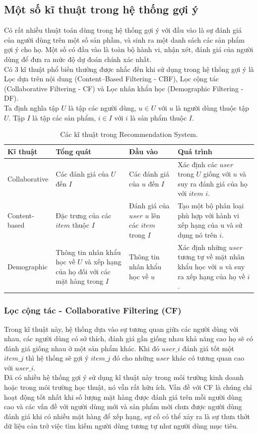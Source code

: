 \subsection{Một số kĩ thuật trong hệ thống gợi ý}
Có rất nhiều thuật toán dùng trong hệ thống gợi ý với đầu vào là sự đánh giá của người dùng trên một số sản phầm, và sinh ra một danh sách các sản phẩm gợi ý cho họ. Một số có đầu vào là toàn bộ hành vi, nhận xét, đánh giá của người dùng để đưa ra mức độ dự đoán chính xác nhất.\\
Có 3 kĩ thuật phổ biến thường được nhắc đến khi sử dụng trong hệ thống gợi ý là Lọc dựa trên nội dung (Content–Based Filtering - CBF), Lọc cộng tác (Collaborative Filtering - CF) và Lọc nhân khẩu học (Demographic Filtering - DF).\\
Ta định nghĩa tập $U$ là tập các người dùng, $u \in U$ với $u$ là người dùng thuộc tập $U$. Tập $I$ là tập các sản phẩm, $i \in I$ với $i$ là sản phẩm thuộc $I$.
\begin{table}[H]
    \centering
    \begin{tabular}{|p{3cm}|p{3cm}|p{3cm}|p{3.5cm}|}
    \hline
        \textbf{Kĩ thuật} & \textbf{Tổng quát}& \textbf{Đầu vào}& \textbf{Quá trình} \\ \hline
         Collaborative & Các đánh giá của $U$ đến $I$ & Các đánh giá của $u$ đến $I$ & Xác định các $user$ trong $U$ giống với $u$ và suy ra đánh giá  của họ với $item$ $i$.\\ \hline
         Content-based & Đặc trưng của các $item$ thuộc $I$ & Đánh giá của $user$ $u$ lên các $item$ trong $I$ & Tạo một bộ phân loại phù hợp với hành vi xếp hạng của u và sử dụng nó trên $i$.\\ \hline
         Demographic & Thông tin nhân khẩu học về $U$ và xếp hạng của họ đối với các mặt hàng trong $I$ & Thông tin nhân khẩu học về $u$ & Xác định những $user$ tương tự về mặt nhân khẩu học với $u$ và suy ra xếp hạng của họ về $i$. \\ \hline
    \end{tabular}
    \caption{Các kĩ thuật trong Recommendation System.}
    \label{tab:my_label}
\end{table}

\subsubsection{Lọc cộng tác - Collaborative Filtering (CF)}
Trong kĩ thuật này, hệ thống dựa vào sự tương quan giữa các người dùng với nhau, các người dùng có sở thích, đánh giá gần giống nhau khả năng cao họ sẽ có đánh giá giống nhau ở một sản phẩm khác. Khi đó $user\_i$ đánh giá tốt một $item\_j$ thì hệ thống sẽ gợi ý $item\_j$ đó cho những $user$ khác có tương quan cao với $user\_i$.\\
Đã có nhiều hệ thống gợi ý sử dụng kĩ thuật này trong môi trường kinh doanh hoặc trong môi trường học thuật, nó vẫn rất hữu ích. Vấn đề với CF là chúng chỉ hoạt động tốt nhất khi số lượng mặt hàng được đánh giá trên mỗi người dùng cao và các vấn đề với người dùng mới và sản phẩm mới chưa được người dùng đánh giá khi có nhiều mặt hàng để xếp hạng, sự cố có thể xảy ra là sự thưa thớt dữ liệu cản trở việc tìm kiếm người dùng tương tự như người dùng mục tiêu.

